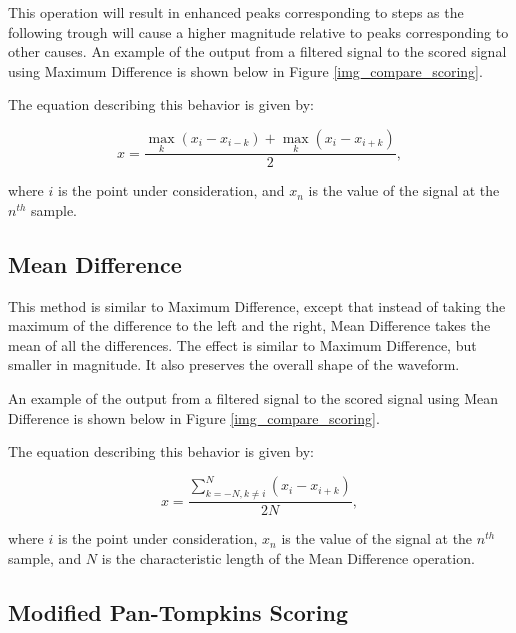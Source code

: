                 This operation will result in enhanced peaks corresponding to steps as the following trough will cause a higher magnitude relative to peaks corresponding to other causes. An example of the output from a filtered signal to the scored signal using Maximum Difference is shown below in Figure \ref{img_compare_scoring}.

                The equation describing this behavior is given by:

                \begin{equation}
                x = \frac{\max\limits_k{(x_i - x_{i-k})} + \max\limits_k{(x_i - x_{i+k})}}{2},
                \end{equation}

                where $i$ is the point under consideration, and $x_n$ is the value of the signal at the $n^{th}$ sample.
              

            \subsection{Mean Difference}

                This method is similar to Maximum Difference, except that instead of taking the maximum of the difference to the left and the right, Mean Difference takes the mean of all the differences. The effect is similar to Maximum Difference, but smaller in magnitude. It also preserves the overall shape of the waveform.

                An example of the output from a filtered signal to the scored signal using Mean Difference is shown below in Figure \ref{img_compare_scoring}.

                The equation describing this behavior is given by:

                \begin{equation}
                x = \frac{\sum_{k=-N, k\neq i}^{N} (x_i - x_{i+k})}{2N},
                \end{equation}

                where $i$ is the point under consideration, $x_n$ is the value of the signal at the $n^{th}$ sample, and $N$ is the characteristic length of the Mean Difference operation.


            \subsection{Modified Pan-Tompkins Scoring}

